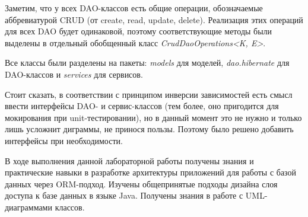 \documentclass[a4paper,14pt]{extarticle}
\newcommand{\Code}[1]{\textit{#1}}
\begin{document}
Заметим, что у всех DAO-классов есть общие операции, обозначаемые аббревиатурой
CRUD (от create, read, update, delete). Реализация этих операций для всех DAO
будет одинаковой, поэтому соответствующие методы были выделены в отдельный
обобщенный класс \Code{CrudDaoOperations<K, E>}.

Все классы были разделены на пакеты: \Code{models} для моделей,
\Code{dao.hibernate} для DAO-классов и \Code{services} для сервисов.

Стоит сказать, в соответствии с принципом инверсии зависимостей есть смысл
ввести интерфейсы DAO- и сервис-классов (тем более, оно пригодится для
мокирования при unit-тестировании), но в данный момент это не нужно и только
лишь усложнит диграммы, не принося пользы. Поэтому было решено добавить
интерфейсы при необходимости.


\clearpage



В ходе выполнения данной лабораторной работы получены знания и практические
навыки в разработке архитектуры приложений для работы с базой данных через
ORM-подход. Изучены общепринятые подходы дизайна слоя доступа к
базе данных в языке Java. Получены знания в работе с UML-диаграммами классов.
\end{document}
